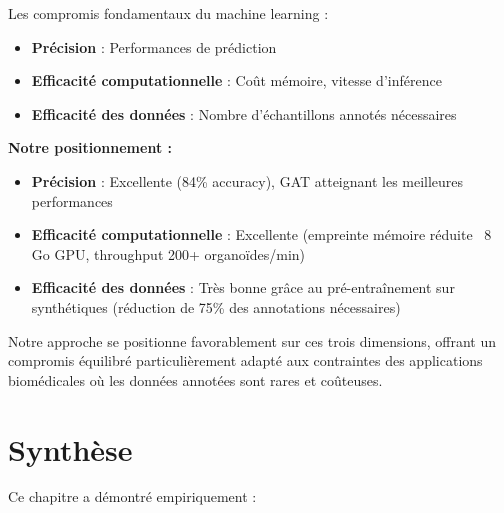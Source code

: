 Les compromis fondamentaux du machine learning :
\begin{itemize}
    \item \textbf{Précision} : Performances de prédiction
    \item \textbf{Efficacité computationnelle} : Coût mémoire, vitesse d'inférence
    \item \textbf{Efficacité des données} : Nombre d'échantillons annotés nécessaires
\end{itemize}

\textbf{Notre positionnement :}
\begin{itemize}
    \item \textbf{Précision} : Excellente (84\% accuracy), GAT atteignant les meilleures performances
    \item \textbf{Efficacité computationnelle} : Excellente (empreinte mémoire réduite ~8 Go GPU, throughput 200+ organoïdes/min)
    \item \textbf{Efficacité des données} : Très bonne grâce au pré-entraînement sur synthétiques (réduction de 75\% des annotations nécessaires)
\end{itemize}

Notre approche se positionne favorablement sur ces trois dimensions, offrant un compromis équilibré particulièrement adapté aux contraintes des applications biomédicales où les données annotées sont rares et coûteuses.

\section{Synthèse}

Ce chapitre a démontré empiriquement :

